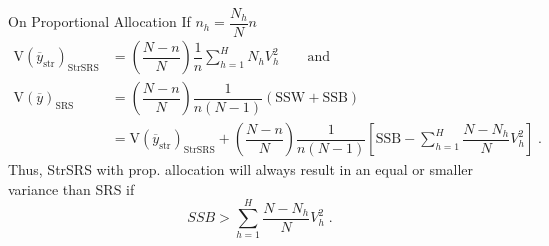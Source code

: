 \documentclass[10pt]{beamer}\usepackage[]{graphicx}\usepackage[]{color}
\newcommand{\E}[1]{\text{E}\left(#1\right)}
\newcommand{\V}[1]{\text{V}\left(#1\right)}
\begin{document}
\begin{frame}{On Proportional Allocation}
If $n_h =  \dfrac{N_h}{N}  n$  
\begin{align*}
\V{\overline{y}_{\text{str}}}_{\text{StrSRS}} & = \left( \dfrac{N - n}{N} \right) \dfrac{1}{n} \sum_{h=1}^H N_h  V_{h}^2\qquad \text{and }\\
\V{\overline{y}}_{\text{SRS}} & = \left( \dfrac{N - n}{N} \right) \dfrac{1}{n(N-1)} \left( \text{SSW} + \text{SSB} \right) \\
& = \V{\overline{y}_{\text{str}}}_{\text{StrSRS}} + \left(\dfrac{N - n}{N}  \right) \dfrac{1}{n(N-1)}\left[ \text{SSB} - \sum_{h=1}^H \dfrac{N - N_h}{N} V^2_{h}  \right]\;.
\end{align*}
Thus, StrSRS with prop. allocation will always result in an equal or smaller variance than SRS if
$$ SSB > \sum_{h=1}^H \dfrac{N - N_h}{N} V^2_{h} \;.$$
\end{frame}




\end{document}

